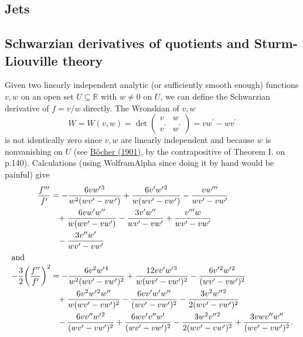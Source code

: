 \documentclass[11pt,leqno]{article}
\theoremstyle{plain}
\theoremstyle{definition}
\numberwithin{equation}{section}
\numberwithin{lem}{section}
\begin{document}
\subsection{Jets}
\newpage\subsection{Schwarzian derivatives of quotients and Sturm-Liouville theory}
Given two linearly independent analytic (or sufficiently smooth enough) functions $v,w$ on an open set $U\subseteq \mathbb R$ with $w\neq 0$ on $U$, we can define the Schwarzian derivative of $f = v/w$ directly. The Wronskian of $v,w$
\[W = W(v,w) = \det\begin{pmatrix}
    v & w \\ v^\prime & w^\prime
\end{pmatrix} = vw^\prime - wv^\prime\]
is not identically zero since $v,w$ are linearly independent and because $w$ is nonvanishing on $U$ (see \href{https://www.ams.org/journals/tran/1901-002-02/S0002-9947-1901-1500560-5/S0002-9947-1901-1500560-5.pdf}{B\^ocher (1901)}, by the contrapositive of Theorem I. on p.140). Calculations (using WolframAlpha since doing it by hand would be painful) give
\begin{align*}
    \frac{f^{\prime\prime\prime}}{f^\prime} &= -\frac{6 v{} w^{\prime}{}^3}{w{}^2 (w{} v^{\prime}{} - v{} w^{\prime}{})} + \frac{6 v^{\prime}{} w^{\prime}{}^2}{w{} (w{} v^{\prime}{} - v{} w^{\prime}{})} - \frac{v{} w^{\prime\prime\prime}{}}{w{} v^{\prime}{} - v{} w^{\prime}{}} \\
    &\phantom{=}+ \frac{6 v{} w^{\prime}{} w^{\prime\prime}{}}{w{} (w{} v^{\prime}{} - v{} w^{\prime}{})} - \frac{3 v^{\prime}{} w^{\prime\prime}{}}{w{} v^{\prime}{} - v{} w^{\prime}{}} + \frac{v^{\prime\prime\prime}{} w{}}{w{} v^{\prime}{} - v{} w^{\prime}{}} \\
    &\phantom{=}- \frac{3 v^{\prime\prime}{} w^{\prime}{}}{w{} v^{\prime}{} - v{} w^{\prime}{}} \\\intertext{and}
    -\frac{3}{2}\biggl(\frac{f^{\prime\prime}}{f^\prime}\biggr)^2 &= -\frac{6 v{}^2 w^{\prime}{}^4}{w{}^2 (w{} v^{\prime}{} - v{} w^{\prime}{})^2} + \frac{12 v{} v^{\prime}{} w^{\prime}{}^3}{w{} (w{} v^{\prime}{} - v{} w^{\prime}{})^2} - \frac{6 v^{\prime}{}^2 w^{\prime}{}^2}{(w{} v^{\prime}{} - v{} w^{\prime}{})^2} \\
    &\phantom{=}+ \frac{6 v{}^2 w^{\prime}{}^2 w^{\prime\prime}{}}{w{} (w{} v^{\prime}{} - v{} w^{\prime}{})^2} - \frac{6 v{} v^{\prime}{} w^{\prime}{} w^{\prime\prime}{}}{(w{} v^{\prime}{} - v{} w^{\prime}{})^2} - \frac{3 v{}^2 w^{\prime\prime}{}^2}{2 (w{} v^{\prime}{} - v{} w^{\prime}{})^2}\\
    &\phantom{=} - \frac{6 v{} v^{\prime\prime}{} w^{\prime}{}^2}{(w{} v^{\prime}{} - v{} w^{\prime}{})^2} + \frac{6 w{} v^{\prime}{} v^{\prime\prime}{} w^{\prime}{}}{(w{} v^{\prime}{} - v{} w^{\prime}{})^2} - \frac{3 w{}^2 v^{\prime\prime}{}^2}{2 (w{} v^{\prime}{} - v{} w^{\prime}{})^2} + \frac{3 v{} w{} v^{\prime\prime}{} w^{\prime\prime}{}}{(w{} v^{\prime}{} - v{} w^{\prime}{})^2}.
\end{align*}
\end{document}
